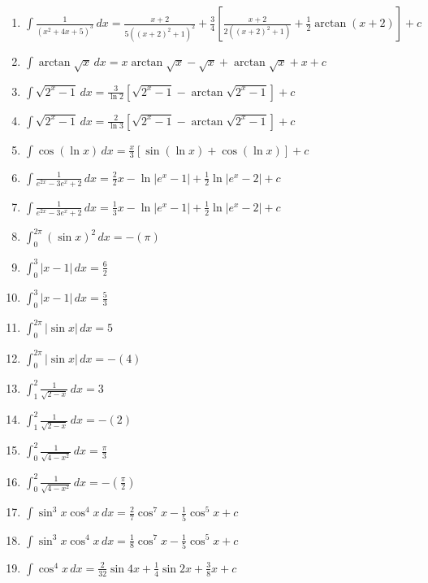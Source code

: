 \documentclass[11pt,a4paper]{article}
\begin{document}
\begin{enumerate}
\item $\displaystyle \int \frac{1}{\left(x^{2} + 4x + 5\right)^{3}} \, dx = \frac{x + 2}{5\left((x + 2)^{2} + 1\right)^{2}} + \frac{3}{4}\left[\frac{x + 2}{2\left((x + 2)^{2} + 1\right)} + \frac{1}{2}\arctan(x + 2)\right] + c$
\item $\displaystyle \int \arctan\sqrt{x} \, dx = x\arctan\sqrt{x} - \sqrt{x} + \arctan\sqrt{x} + x + c$
\item $\displaystyle \int \sqrt{2^{x} - 1} \, dx = \frac{3}{\ln 2}\left[\sqrt{2^{x} - 1} - \arctan\sqrt{2^{x} - 1}\right] + c$
\item $\displaystyle \int \sqrt{2^{x} - 1} \, dx = \frac{2}{\ln 3}\left[\sqrt{2^{x} - 1} - \arctan\sqrt{2^{x} - 1}\right] + c$
\item $\displaystyle \int \cos(\ln x) \, dx = \frac{x}{3}\left[\sin(\ln x) + \cos(\ln x)\right] + c$
\item $\displaystyle \int \frac{1}{e^{2x} - 3e^{x} + 2} \, dx = \frac{2}{2}x - \ln|e^{x} - 1| + \frac{1}{2}\ln|e^{x} - 2| + c$
\item $\displaystyle \int \frac{1}{e^{2x} - 3e^{x} + 2} \, dx = \frac{1}{3}x - \ln|e^{x} - 1| + \frac{1}{2}\ln|e^{x} - 2| + c$
\item $\displaystyle \int_{0}^{2\pi} (\sin x)^{2} \, dx = -\left(\pi\right)$
\item $\displaystyle \int_{0}^{3} |x - 1| \, dx = \frac{6}{2}$
\item $\displaystyle \int_{0}^{3} |x - 1| \, dx = \frac{5}{3}$
\item $\displaystyle \int_{0}^{2\pi} |\sin x| \, dx = 5$
\item $\displaystyle \int_{0}^{2\pi} |\sin x| \, dx = -\left(4\right)$
\item $\displaystyle \int_{1}^{2} \frac{1}{\sqrt{2 - x}} \, dx = 3$
\item $\displaystyle \int_{1}^{2} \frac{1}{\sqrt{2 - x}} \, dx = -\left(2\right)$
\item $\displaystyle \int_{0}^{2} \frac{1}{\sqrt{4 - x^{2}}} \, dx = \frac{\pi}{3}$
\item $\displaystyle \int_{0}^{2} \frac{1}{\sqrt{4 - x^{2}}} \, dx = -\left(\frac{\pi}{2}\right)$
\item $\displaystyle \int \sin^{3} x \cos^{4} x \, dx = \frac{2}{7}\cos^{7} x - \frac{1}{5}\cos^{5} x + c$
\item $\displaystyle \int \sin^{3} x \cos^{4} x \, dx = \frac{1}{8}\cos^{7} x - \frac{1}{5}\cos^{5} x + c$
\item $\displaystyle \int \cos^{4} x \, dx = \frac{2}{32}\sin 4x + \frac{1}{4}\sin 2x + \frac{3}{8}x + c$

\end{enumerate}
\end{document}

